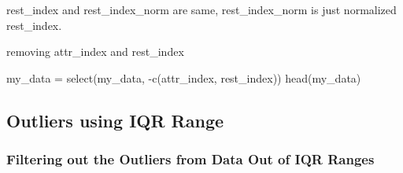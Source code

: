 \documentclass[
]{article}
\newenvironment{Shaded}{\begin{snugshade}}{\end{snugshade}}
\newcommand{\FunctionTok}[1]{\textcolor[rgb]{0.00,0.00,0.00}{#1}}
\newcommand{\NormalTok}[1]{#1}
\newcommand{\OtherTok}[1]{\textcolor[rgb]{0.56,0.35,0.01}{#1}}
\newcommand{\SpecialCharTok}[1]{\textcolor[rgb]{0.00,0.00,0.00}{#1}}
\begin{document}
rest\_index and rest\_index\_norm are same, rest\_index\_norm is just
normalized rest\_index.

removing attr\_index and rest\_index

\begin{Shaded}
\begin{Highlighting}[]
\NormalTok{my\_data }\OtherTok{=} \FunctionTok{select}\NormalTok{(my\_data, }\SpecialCharTok{{-}}\FunctionTok{c}\NormalTok{(attr\_index, rest\_index))}
\FunctionTok{head}\NormalTok{(my\_data)}
\end{Highlighting}
\end{Shaded}

\hypertarget{outliers-using-iqr-range}{%
\subsection{Outliers using IQR Range}\label{outliers-using-iqr-range}}

\hypertarget{filtering-out-the-outliers-from-data-out-of-iqr-ranges}{%
\subsubsection{Filtering out the Outliers from Data Out of IQR
Ranges}\label{filtering-out-the-outliers-from-data-out-of-iqr-ranges}}
\end{document}
